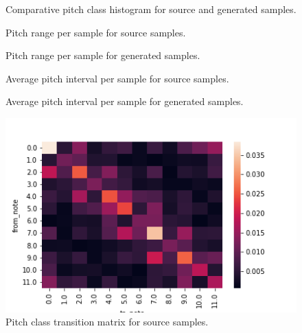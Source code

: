 \documentclass[sigconf,authorversion]{acmart}
\begin{document}
\begin{figure}[htbp]
    \begin{center}
        \scalebox{0.6}{}
    \end{center}
    \caption{Comparative pitch class histogram for source and generated samples.}
    \label{pch}
\end{figure}

\begin{figure}[htbp]
    \begin{center}
        \scalebox{0.6}{}
    \end{center}
    \caption{Pitch range per sample for source samples.}
    \label{source_ranges}
\end{figure}

\begin{figure}[htbp]
    \begin{center}
        \scalebox{0.6}{}
    \end{center}
    \caption{Pitch range per sample for generated samples.}
    \label{generated_ranges}
\end{figure}

\begin{figure}[htbp]
    \begin{center}
        \scalebox{0.6}{}
    \end{center}
    \caption{Average pitch interval per sample for source samples.}
    \label{source_interval}
\end{figure}

\begin{figure}[htbp]
    \begin{center}
        \scalebox{0.6}{}
    \end{center}
    \caption{Average pitch interval per sample for generated samples.}
    \label{generated_interval}
\end{figure}


\begin{figure}[htbp]
  \centering
  \includegraphics[width=\linewidth]{figures/pctm_source.png}
  \caption{Pitch class transition matrix for source samples.}
  \label{pctm_source}
\end{figure}
\end{document}
